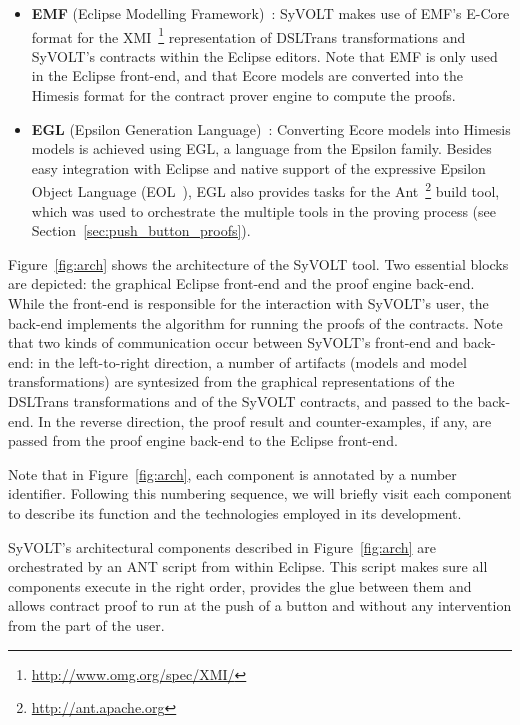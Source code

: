 \begin{itemize}
  \item \textbf{EMF} (Eclipse Modelling Framework)~\cite{}: SyVOLT makes use of
  EMF's E-Core format for the XMI~\footnote{\url{http://www.omg.org/spec/XMI/}} representation of DSLTrans transformations
  and SyVOLT's contracts within the Eclipse editors. Note that EMF is only used
  in the Eclipse front-end, and that Ecore models are converted into
  the Himesis format for the contract prover engine to compute the
  proofs.\\
  \item \textbf{EGL} (Epsilon Generation Language)~\cite{}: Converting Ecore
  models into Himesis models is achieved using EGL, a language from the Epsilon
  family. Besides easy integration with Eclipse and native support of the expressive
Epsilon Object Language (EOL~\cite{Kolovos}), EGL also provides tasks for the
Ant~\footnote{\url{http://ant.apache.org}} build tool, which was used to
orchestrate the multiple tools in the proving process (see
Section~\ref{sec:push_button_proofs}).\\
\end{itemize}


Figure~\ref{fig:arch} shows the architecture of the SyVOLT tool. Two essential
blocks are depicted: the graphical Eclipse front-end and the proof engine
back-end. While the front-end is responsible for the interaction with SyVOLT's
user, the back-end implements the algorithm for running the proofs of the contracts. Note
that two kinds of communication occur between SyVOLT's front-end and back-end:
in the left-to-right direction, a number of artifacts (models and model
transformations) are syntesized from the graphical representations of the
DSLTrans transformations and of the SyVOLT contracts, and passed to the
back-end.
In the reverse direction, the proof result and counter-examples, if any, are
passed from the proof engine back-end to the Eclipse front-end.

Note that in Figure~\ref{fig:arch}, each component is annotated by a number
identifier. Following this numbering sequence, we will briefly visit each
component to describe its function and the technologies employed in its development.

SyVOLT's architectural components described in Figure~\ref{fig:arch} are
orchestrated by an ANT script from within Eclipse. This script makes sure all components execute in the
right order, provides the glue between them and allows contract proof to run at
the push of a button and without any intervention from the part of the user.


